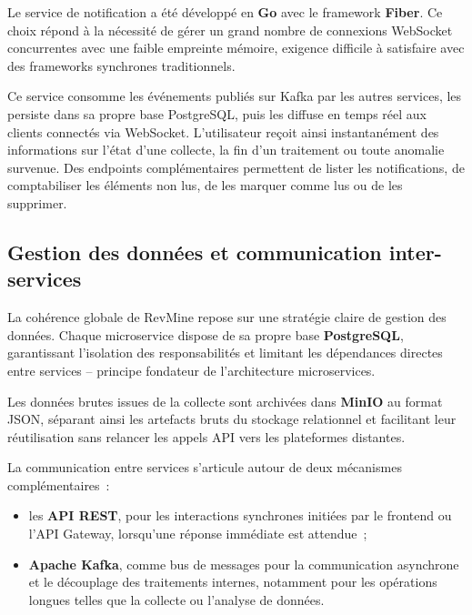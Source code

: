 Le service de notification a été développé en \textbf{Go} avec le framework \textbf{Fiber}. Ce
choix répond à la nécessité de gérer un grand nombre de connexions WebSocket concurrentes avec
une faible empreinte mémoire, exigence difficile à satisfaire avec des frameworks synchrones
traditionnels.

Ce service consomme les événements publiés sur Kafka par les autres services, les persiste dans
sa propre base PostgreSQL, puis les diffuse en temps réel aux clients connectés via WebSocket.
L'utilisateur reçoit ainsi instantanément des informations sur l'état d'une collecte, la fin
d'un traitement ou toute anomalie survenue. Des endpoints complémentaires permettent de lister
les notifications, de comptabiliser les éléments non lus, de les marquer comme lus ou de les
supprimer.

\subsection{Gestion des données et communication inter-services}

La cohérence globale de RevMine repose sur une stratégie claire de gestion des données. Chaque
microservice dispose de sa propre base \textbf{PostgreSQL}, garantissant l'isolation des
responsabilités et limitant les dépendances directes entre services -- principe fondateur de
l'architecture microservices.

Les données brutes issues de la collecte sont archivées dans \textbf{MinIO} au format JSON,
séparant ainsi les artefacts bruts du stockage relationnel et facilitant leur réutilisation sans
relancer les appels API vers les plateformes distantes.

La communication entre services s'articule autour de deux mécanismes complémentaires~:

\begin{itemize}
    \item les \textbf{API REST}, pour les interactions synchrones initiées par le frontend ou
          l'API Gateway, lorsqu'une réponse immédiate est attendue~;
    \item \textbf{Apache Kafka}, comme bus de messages pour la communication asynchrone et le
          découplage des traitements internes, notamment pour les opérations longues telles que
          la collecte ou l'analyse de données.
\end{itemize}

